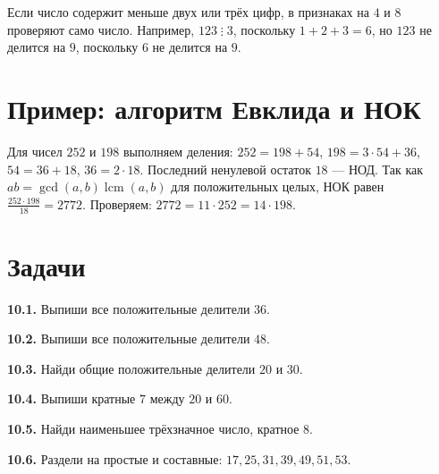 Если число содержит меньше двух или трёх цифр, в признаках на \(4\) и \(8\) проверяют само число.
Например, \(123\mathrel{\vdots}3\), поскольку \(1+2+3=6\),
но \(123\) не делится на \(9\), поскольку \(6\) не делится на \(9\).
\section{Пример: алгоритм Евклида и НОК}
\begin{example}Для чисел \(252\) и \(198\) выполняем деления: \(252=198+54\), \(198=3\cdot54+36\), \(54=36+18\), \(36=2\cdot18\). Последний ненулевой остаток \(18\) --- НОД. Так как \(ab=\gcd(a,b)\operatorname{lcm}(a,b)\) для положительных целых, НОК равен \(\frac{252\cdot198}{18}=2772\). Проверяем: \(2772=11\cdot252=14\cdot198\).\end{example}
\section*{Задачи}
\begingroup\setlength{\parskip}{2pt}
\noindent\begin{minipage}[t]{\linewidth}\textbf{10.1.} Выпиши все положительные делители \(36\).\par\end{minipage}\par
\noindent\begin{minipage}[t]{\linewidth}\textbf{10.2.} Выпиши все положительные делители \(48\).\par\end{minipage}\par
\noindent\begin{minipage}[t]{\linewidth}\textbf{10.3.} Найди общие положительные делители \(20\) и \(30\).\par\end{minipage}\par
\noindent\begin{minipage}[t]{\linewidth}\textbf{10.4.} Выпиши кратные \(7\) между \(20\) и \(60\).\par\end{minipage}\par
\noindent\begin{minipage}[t]{\linewidth}\textbf{10.5.} Найди наименьшее трёхзначное число, кратное \(8\).\par\end{minipage}\par
\noindent\begin{minipage}[t]{\linewidth}\textbf{10.6.} Раздели на простые и составные: \(17,\allowbreak 25,\allowbreak 31,\allowbreak 39,\allowbreak 49,\allowbreak 51,\allowbreak 53\).\par\end{minipage}\par
